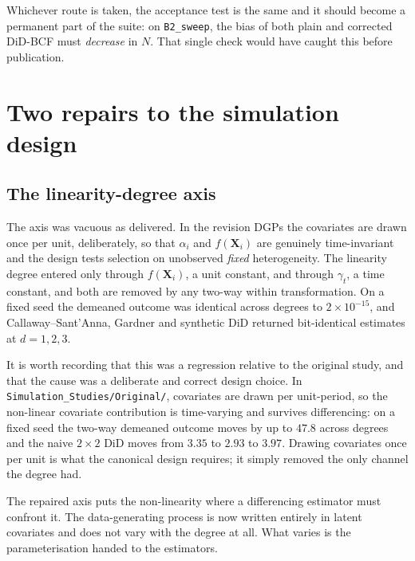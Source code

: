 \documentclass[11pt]{article}
\newcommand{\Xb}{\mathbf{X}}
\begin{document}
Whichever route is taken, the acceptance test is the same and it should become
a permanent part of the suite: on \texttt{B2\_sweep}, the bias of both plain and
corrected DiD-BCF must \emph{decrease} in $N$. That single check would have
caught this before publication.

\section{Two repairs to the simulation design}

\subsection{The linearity-degree axis}

The axis was vacuous as delivered. In the revision DGPs the covariates are
drawn once per unit, deliberately, so that $\alpha_i$ and $f(\Xb_i)$ are
genuinely time-invariant and the design tests selection on unobserved
\emph{fixed} heterogeneity. The linearity degree entered only through
$f(\Xb_i)$, a unit constant, and through $\gamma_t$, a time constant, and both
are removed by any two-way within transformation. On a fixed seed the demeaned
outcome was identical across degrees to $2\times10^{-15}$, and
Callaway--Sant'Anna, Gardner and synthetic DiD returned bit-identical estimates
at $d=1,2,3$.

It is worth recording that this was a regression relative to the original
study, and that the cause was a deliberate and correct design choice. In
\texttt{Simulation\_Studies/Original/}, covariates are drawn per unit-period,
so the non-linear covariate contribution is time-varying and survives
differencing: on a fixed seed the two-way demeaned outcome moves by up to
$47.8$ across degrees and the naive $2\times2$ DiD moves from $3.35$ to $2.93$
to $3.97$. Drawing covariates once per unit is what the canonical design
requires; it simply removed the only channel the degree had.

The repaired axis puts the non-linearity where a differencing estimator must
confront it. The data-generating process is now written entirely in latent
covariates and does not vary with the degree at all. What varies is the
parameterisation handed to the estimators.
\end{document}
